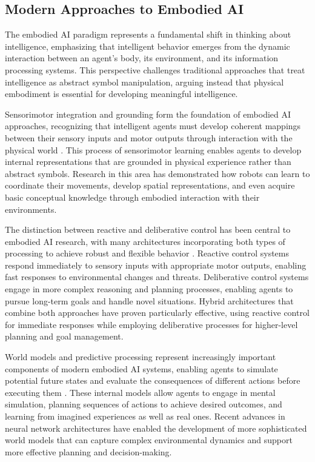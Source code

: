 \subsection{Modern Approaches to Embodied AI}

The embodied AI paradigm represents a fundamental shift in thinking about intelligence, emphasizing that intelligent behavior emerges from the dynamic interaction between an agent's body, its environment, and its information processing systems. This perspective challenges traditional approaches that treat intelligence as abstract symbol manipulation, arguing instead that physical embodiment is essential for developing meaningful intelligence.

Sensorimotor integration and grounding form the foundation of embodied AI approaches, recognizing that intelligent agents must develop coherent mappings between their sensory inputs and motor outputs through interaction with the physical world \cite{pfeifer2006body}. This process of sensorimotor learning enables agents to develop internal representations that are grounded in physical experience rather than abstract symbols. Research in this area has demonstrated how robots can learn to coordinate their movements, develop spatial representations, and even acquire basic conceptual knowledge through embodied interaction with their environments.

The distinction between reactive and deliberative control has been central to embodied AI research, with many architectures incorporating both types of processing to achieve robust and flexible behavior \cite{brooks1991intelligence}. Reactive control systems respond immediately to sensory inputs with appropriate motor outputs, enabling fast responses to environmental changes and threats. Deliberative control systems engage in more complex reasoning and planning processes, enabling agents to pursue long-term goals and handle novel situations. Hybrid architectures that combine both approaches have proven particularly effective, using reactive control for immediate responses while employing deliberative processes for higher-level planning and goal management.

World models and predictive processing represent increasingly important components of modern embodied AI systems, enabling agents to simulate potential future states and evaluate the consequences of different actions before executing them \cite{clark2013whatever}. These internal models allow agents to engage in mental simulation, planning sequences of actions to achieve desired outcomes, and learning from imagined experiences as well as real ones. Recent advances in neural network architectures have enabled the development of more sophisticated world models that can capture complex environmental dynamics and support more effective planning and decision-making.

